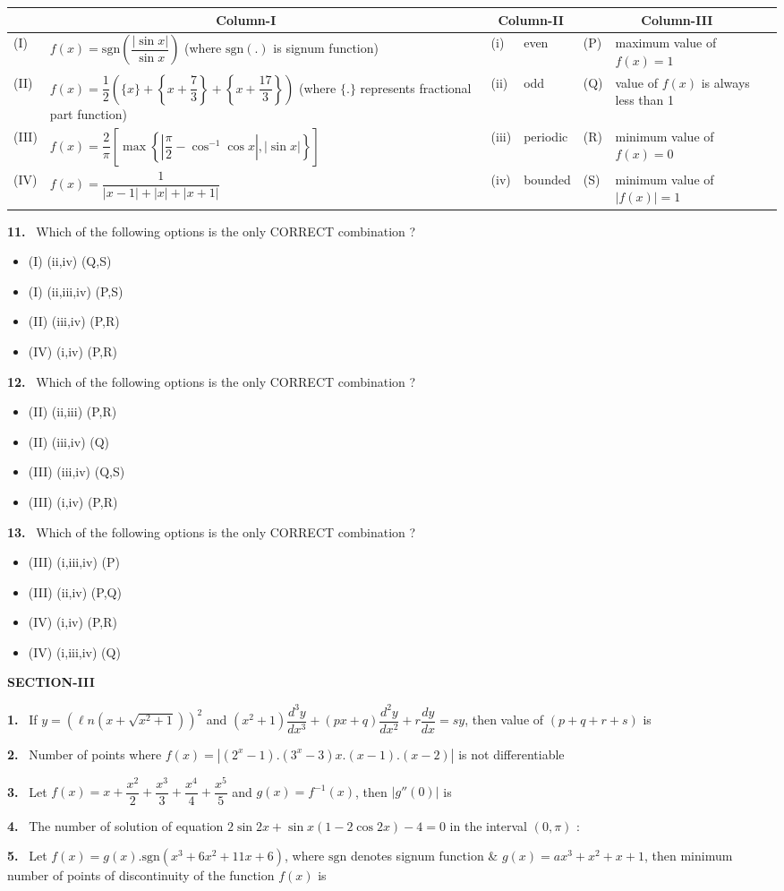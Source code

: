 \documentclass[10pt]{extarticle}
\newcommand{\sect}[1]{\par\smallskip\noindent\textbf{#1}\par}
\newcommand{\qn}[1]{\par\smallskip\noindent\textbf{#1.}~}
\newenvironment{qoptions}{\begin{itemize}[leftmargin=1.8em,itemsep=1pt,topsep=2pt,label={}]}{\end{itemize}}
\newcommand{\opt}[2]{\item[(#1)] #2}
\begin{document}
\noindent\begin{minipage}{\textwidth}
\footnotesize\setlength{\tabcolsep}{3pt}\begin{tabular}{|l|p{6.5cm}|l|l|l|p{3.2cm}|}
\hline
\multicolumn{2}{|c|}{Column-I} & \multicolumn{2}{c|}{Column-II} & \multicolumn{2}{c|}{Column-III}\\
\hline
(I) & $f(x)=\mathrm{sgn}\left(\dfrac{|\sin x|}{\sin x}\right)$ (where $\mathrm{sgn}(.)$ is signum function) & (i) & even & (P) & maximum value of $f(x)=1$\\
\hline
(II) & $f(x)=\dfrac12\left(\{x\}+\left\{x+\dfrac73\right\}+\left\{x+\dfrac{17}3\right\}\right)$ (where $\{.\}$ represents fractional part function) & (ii) & odd & (Q) & value of $f(x)$ is always less than 1\\
\hline
(III) & $f(x)=\dfrac2\pi\left[\max\left\{\left|\dfrac\pi2-\cos^{-1}\cos x\right|,|\sin x|\right\}\right]$ & (iii) & periodic & (R) & minimum value of $f(x)=0$\\
\hline
(IV) & $f(x)=\dfrac1{|x-1|+|x|+|x+1|}$ & (iv) & bounded & (S) & minimum value of $|f(x)|=1$\\
\hline
\end{tabular}
\end{minipage}
\begin{multicols}{2}
\qn{11} Which of the following options is the only CORRECT combination ?
\begin{qoptions}
\opt{A}{(I) (ii,iv) (Q,S)}
\opt{B}{(I) (ii,iii,iv) (P,S)}
\opt{C}{(II) (iii,iv) (P,R)}
\opt{D}{(IV) (i,iv) (P,R)}
\end{qoptions}
\qn{12} Which of the following options is the only CORRECT combination ?
\begin{qoptions}
\opt{A}{(II) (ii,iii) (P,R)}
\opt{B}{(II) (iii,iv) (Q)}
\opt{C}{(III) (iii,iv) (Q,S)}
\opt{D}{(III) (i,iv) (P,R)}
\end{qoptions}
\qn{13} Which of the following options is the only CORRECT combination ?
\begin{qoptions}
\opt{A}{(III) (i,iii,iv) (P)}
\opt{B}{(III) (ii,iv) (P,Q)}
\opt{C}{(IV) (i,iv) (P,R)}
\opt{D}{(IV) (i,iii,iv) (Q)}
\end{qoptions}
\sect{SECTION-III}
\qn{1} If $y=\left(\ell n\left(x+\sqrt{x^2+1}\right)\right)^2$ and $\left(x^2+1\right)\dfrac{d^3y}{dx^3}+(px+q)\dfrac{d^2y}{dx^2}+r\dfrac{dy}{dx}=sy$, then value of $(p+q+r+s)$ is
\qn{2} Number of points where $f(x)=\left|\left(2^x-1\right).\left(3^x-3\right)x.(x-1).(x-2)\right|$ is not differentiable
\qn{3} Let $f(x)=x+\dfrac{x^2}2+\dfrac{x^3}3+\dfrac{x^4}4+\dfrac{x^5}5$ and $g(x)=f^{-1}(x)$, then $\left|g''(0)\right|$ is
\qn{4} The number of solution of equation $2\sin2x+\sin x(1-2\cos2x)-4=0$ in the interval $(0,\pi)$ :
\qn{5} Let $f(x)=g(x).\mathrm{sgn}\left(x^3+6x^2+11x+6\right)$, where $\mathrm{sgn}$ denotes signum function \& $g(x)=ax^3+x^2+x+1$, then minimum number of points of discontinuity of the function $f(x)$ is
\end{multicols}
\end{document}
